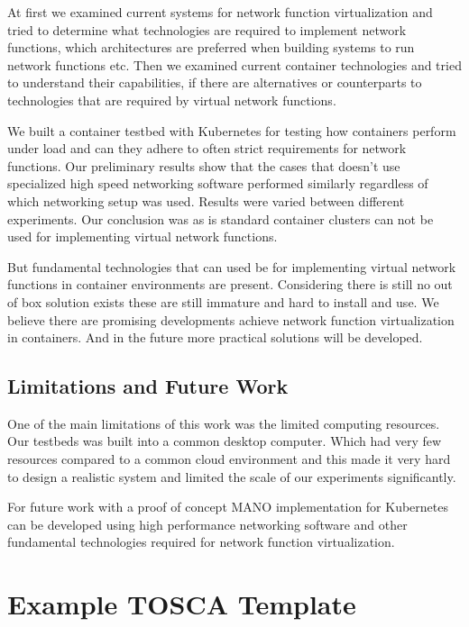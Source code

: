 \documentclass[12pt,oneandhalf,chaparabic,ceng,ms,eng,oneside,pntc]{gsufbe}
\begin{document}
At first we examined current systems for network function virtualization and tried to determine what
technologies are required to implement network functions, which architectures are preferred when
building systems to run network functions etc. Then we examined current container technologies and
tried to understand their capabilities, if there are alternatives or counterparts to technologies that
are required by virtual network functions.

We built a container testbed with Kubernetes for testing how containers perform under load and can they
adhere to often strict requirements for network functions. Our preliminary results show that the cases
that doesn't use specialized high speed networking software performed similarly regardless of which
networking setup was used. Results were varied between different experiments. Our conclusion was as is
standard container clusters can not be used for implementing virtual network functions.

But fundamental technologies that can used be for implementing virtual network functions in
container environments are present. Considering there is still no out of box solution exists these are
still immature and hard to install and use. We believe there are promising developments achieve network
function virtualization in containers. And in the future more practical solutions will be developed.

\section{Limitations and Future Work}
One of the main limitations of this work was the limited computing resources. Our testbeds was 
built into a common desktop computer. Which had very few resources compared to a common cloud
environment and this made it very hard to design a realistic system and limited the scale of our
experiments significantly.

For future work with a proof of concept MANO implementation for Kubernetes can be developed using high
performance networking software and other fundamental technologies required for network function
virtualization.




\appendix
\lstset{%
   breaklines=true,
}
\thispagestyle{empty}
\chapter[]{Example TOSCA Template}
\thispagestyle{empty}
\label{appendix:tosca}

\newpage

\end{document}
